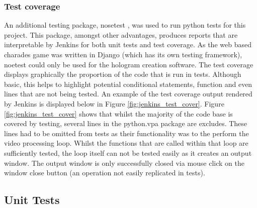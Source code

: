 \subsubsection{Test coverage} 
An additional testing package, nosetest \cite{nosetest}, was used to run python tests for this project. This package, amongst other advantages, produces reports that are interpretable by Jenkins for both unit tests and test coverage. As the web based charades game was written in Django (which has its own testing framework), noetest could only be used for the hologram creation software. The test coverage displays graphically the proportion of the code that is run in tests. Although basic, this helps to highlight potential conditional statements, function and even lines that are not being tested. An example of the test coverage output rendered by Jenkins is displayed below in Figure \ref{fig:jenkins_test_cover}. Figure \ref{fig:jenkins_test_cover} shows that whilst the majority of the code base is covered by testing, several lines in the python.vpa package are excludes. These lines had to be omitted from tests as their functionality was to the perform the video processing loop. Whilst the functions that are called within that loop are sufficiently tested, the loop itself can not be tested easily as it creates an output window. The output window is only successfully closed via mouse click on the window close button (an operation not easily replicated in tests).
\begin{figure}[h!]
\end{figure}
 

\subsection{Unit Tests}


